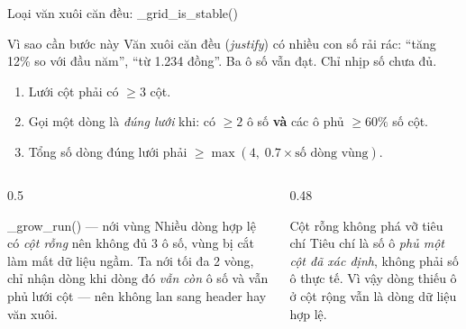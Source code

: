 \documentclass[aspectratio=169,11pt]{beamer}
\newcommand{\src}[1]{{\footnotesize\ttfamily #1}}
\begin{document}
\begin{frame}{Loại văn xuôi căn đều: \src{\_grid\_is\_stable()}}
  \begin{alertblock}{\small Vì sao cần bước này}
    Văn xuôi căn đều (\emph{justify}) có nhiều con số rải rác: ``tăng 12\% so với
    đầu năm'', ``từ 1.234 đồng''. Ba ô số vẫn đạt. Chỉ nhịp số chưa đủ.
  \end{alertblock}
  \begin{enumerate}\small
    \item Lưới cột phải có $\ge 3$ cột.
    \item Gọi một dòng là \emph{đúng lưới} khi: có $\ge 2$ ô số \textbf{và}
      các ô phủ $\ge 60\%$ số cột.
    \item Tổng số dòng đúng lưới phải $\ge \max(4,\;0.7 \times \text{số dòng vùng})$.
  \end{enumerate}
  \begin{columns}[T]
    \begin{column}{0.5\textwidth}
      \begin{block}{\small \src{\_grow\_run()} — nới vùng}
        Nhiều dòng hợp lệ có \emph{cột rỗng} nên không đủ 3 ô số, vùng bị cắt làm
        mất dữ liệu ngầm. Ta nới tối đa 2 vòng, chỉ nhận dòng khi dòng đó \emph{vẫn
        còn} ô số và vẫn phủ lưới cột — nên không lan sang header hay văn xuôi.
      \end{block}
    \end{column}
    \begin{column}{0.48\textwidth}
      \begin{block}{\small Cột rỗng không phá vỡ tiêu chí}
        Tiêu chí là số ô \emph{phủ một cột đã xác định}, không phải số ô thực tế.
        Vì vậy dòng thiếu ô ở cột rộng vẫn là dòng dữ liệu hợp lệ.
      \end{block}
      \vspace{-0.4em}
    \end{column}
  \end{columns}
\end{frame}
\end{document}
